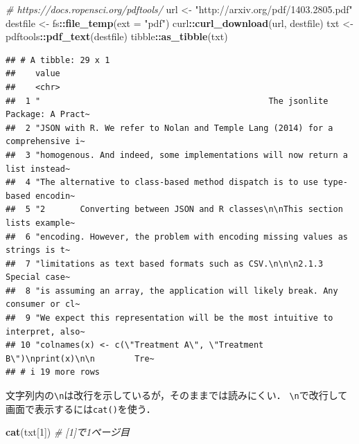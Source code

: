 \documentclass[
]{article}
\newenvironment{Shaded}{\begin{snugshade}}{\end{snugshade}}
\newcommand{\AttributeTok}[1]{\textcolor[rgb]{0.13,0.29,0.53}{#1}}
\newcommand{\CommentTok}[1]{\textcolor[rgb]{0.56,0.35,0.01}{\textit{#1}}}
\newcommand{\DecValTok}[1]{\textcolor[rgb]{0.00,0.00,0.81}{#1}}
\newcommand{\FunctionTok}[1]{\textcolor[rgb]{0.13,0.29,0.53}{\textbf{#1}}}
\newcommand{\NormalTok}[1]{#1}
\newcommand{\OtherTok}[1]{\textcolor[rgb]{0.56,0.35,0.01}{#1}}
\newcommand{\SpecialCharTok}[1]{\textcolor[rgb]{0.81,0.36,0.00}{\textbf{#1}}}
\newcommand{\StringTok}[1]{\textcolor[rgb]{0.31,0.60,0.02}{#1}}
\begin{document}
\begin{Shaded}
\begin{Highlighting}[]
  \CommentTok{\# https://docs.ropensci.org/pdftools/}
\NormalTok{url }\OtherTok{\textless{}{-}} \StringTok{"http://arxiv.org/pdf/1403.2805.pdf"}
\NormalTok{destfile }\OtherTok{\textless{}{-}}\NormalTok{ fs}\SpecialCharTok{::}\FunctionTok{file\_temp}\NormalTok{(}\AttributeTok{ext =} \StringTok{"pdf"}\NormalTok{)}
\NormalTok{curl}\SpecialCharTok{::}\FunctionTok{curl\_download}\NormalTok{(url, destfile)}
\NormalTok{txt }\OtherTok{\textless{}{-}}\NormalTok{ pdftools}\SpecialCharTok{::}\FunctionTok{pdf\_text}\NormalTok{(destfile)}
\NormalTok{tibble}\SpecialCharTok{::}\FunctionTok{as\_tibble}\NormalTok{(txt)}
\end{Highlighting}
\end{Shaded}

\begin{verbatim}
## # A tibble: 29 x 1
##    value                                                                        
##    <chr>                                                                        
##  1 "                                              The jsonlite Package: A Pract~
##  2 "JSON with R. We refer to Nolan and Temple Lang (2014) for a comprehensive i~
##  3 "homogenous. And indeed, some implementations will now return a list instead~
##  4 "The alternative to class-based method dispatch is to use type-based encodin~
##  5 "2       Converting between JSON and R classes\n\nThis section lists example~
##  6 "encoding. However, the problem with encoding missing values as strings is t~
##  7 "limitations as text based formats such as CSV.\n\n\n2.1.3      Special case~
##  8 "is assuming an array, the application will likely break. Any consumer or cl~
##  9 "We expect this representation will be the most intuitive to interpret, also~
## 10 "colnames(x) <- c(\"Treatment A\", \"Treatment B\")\nprint(x)\n\n        Tre~
## # i 19 more rows
\end{verbatim}

文字列内の\texttt{\textbackslash{}n}は改行を示しているが，そのままでは読みにくい．
\texttt{\textbackslash{}n}で改行して画面で表示するには\texttt{cat()}を使う．

\begin{Shaded}
\begin{Highlighting}[]
\FunctionTok{cat}\NormalTok{(txt[}\DecValTok{1}\NormalTok{])  }\CommentTok{\# [1]で1ページ目}
\end{Highlighting}
\end{Shaded}
\end{document}
